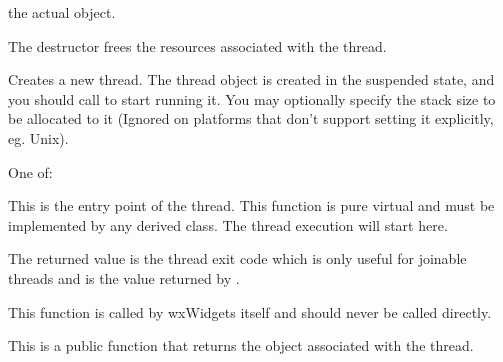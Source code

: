 
the actual  object.



The destructor frees the resources associated with the thread.

\label{wxthreadhelpercreate}


Creates a new thread. The thread object is created in the suspended state, and you
should call  to start running
it.  You may optionally specify the stack size to be allocated to it (Ignored on
platforms that don't support setting it explicitly, eg. Unix).


One of:

\twocolwidtha{7cm}
\begin{twocollist}\itemsep=0pt
\end{twocollist}

\label{wxthreadhelperentry}


This is the entry point of the thread. This function is pure virtual and must
be implemented by any derived class. The thread execution will start here.

The returned value is the thread exit code which is only useful for
joinable threads and is the value returned by
.

This function is called by wxWidgets itself and should never be called
directly.

\label{wxthreadhelpergetthread}


This is a public function that returns the  object
associated with the thread.

